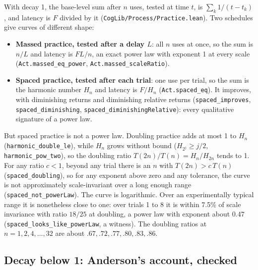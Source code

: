 \documentclass[11pt]{article}
\newcommand{\code}[1]{\texttt{#1}}
\newcommand{\lean}[1]{\texttt{#1}}
\begin{document}
With decay 1, the base-level sum after $n$ uses, tested at time $t$, is $\sum_k 1/(t - t_k)$, and latency is $F$ divided by it (\code{CogLib/Process/Practice.lean}). Two schedules give curves of different shape:
\begin{itemize}
  \item \textbf{Massed practice, tested after a delay $L$}: all $n$ uses at once, so the sum is $n/L$ and latency is $FL/n$, an exact power law with exponent 1 at every scale (\lean{Act.massed\_eq\_power}, \lean{Act.massed\_scaleRatio}).
  \item \textbf{Spaced practice, tested after each trial}: one use per trial, so the sum is the harmonic number $H_n$ and latency is $F/H_n$ (\lean{Act.spaced\_eq}). It improves, with diminishing returns and diminishing relative returns (\lean{spaced\_improves}, \lean{spaced\_diminishing}, \lean{spaced\_diminishingRelative}): every qualitative signature of a power law.
\end{itemize}
But spaced practice is not a power law. Doubling practice adds at most 1 to $H_n$ (\lean{harmonic\_double\_le}), while $H_n$ grows without bound ($H_{2^j} \ge j/2$, \lean{harmonic\_pow\_two}), so the doubling ratio $T(2n)/T(n) = H_n/H_{2n}$ tends to 1. For any ratio $c < 1$, beyond any trial there is an $n$ with $T(2n) > c\,T(n)$ (\lean{spaced\_doubling}), so for any exponent above zero and any tolerance, the curve is not approximately scale-invariant over a long enough range (\lean{spaced\_not\_powerLaw}). The curve is logarithmic. Over an experimentally typical range it is nonetheless close to one: over trials 1 to 8 it is within 7.5\% of scale invariance with ratio $18/25$ at doubling, a power law with exponent about $0.47$ (\lean{spaced\_looks\_like\_powerLaw}, a witness). The doubling ratios at $n = 1, 2, 4, \dots, 32$ are about $.67, .72, .77, .80, .83, .86$.

\subsection{Decay below 1: Anderson's account, checked}
\label{sec:decay}
\end{document}
